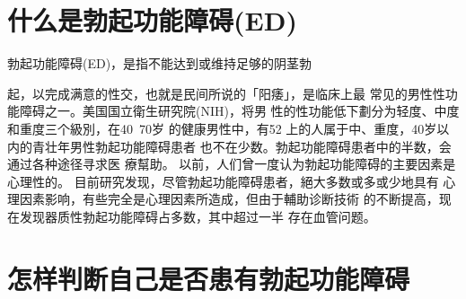 \documentclass[12pt,UTF8]{ctexbook}
\begin{document}
\section{什么是勃起功能障碍(ED)}
勃起功能障碍(ED)，是指不能达到或维持足够的阴茎勃

起，以完成满意的性交，也就是民间所说的「阳痿」，是临床上最
常见的男性性功能障碍之一。美国国立衛生研究院(NIH)，将男
性的性功能低下劃分为轻度、中度和重度三个級別，在40~70岁
的健康男性中，有52%
上的人属于中、重度，40岁以内的青壮年男性勃起功能障碍患者
也不在少数。勃起功能障碍患者中的半数，会通过各种途径寻求医
療幫助。
以前，人们曾一度认为勃起功能障碍的主要因素是心理性的。
目前研究发现，尽管勃起功能障碍患者，絕大多数或多或少地具有
心理因素影响，有些完全是心理因素所造成，但由于輔助诊断技術
的不断提高，现在发现器质性勃起功能障碍占多数，其中超过一半
存在血管问题。

\section{怎样判断自己是否患有勃起功能障碍}
\end{document}
